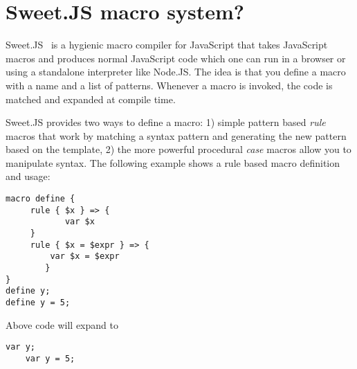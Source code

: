 \section{Sweet.JS macro system?}

Sweet.JS~\cite{bib6} is a hygienic macro compiler for JavaScript that takes JavaScript macros and produces normal JavaScript code which one can run in a browser or using a standalone interpreter like Node.JS. The idea is that you define a macro with a name and a list of patterns. Whenever a macro is invoked, the code is matched and expanded at  compile time.

Sweet.JS provides two ways to define a macro: 1) simple pattern based \textit{rule} macros that work by matching a syntax pattern and generating the new pattern based on the template, 2) the more powerful procedural \textit{case} macros allow you to manipulate syntax. The following example shows a rule based macro definition and usage:

\begin{lstlisting}[frame=single]
macro define {
   	 rule { $x } => {
   		    var $x
   	 }
   	 rule { $x = $expr } => {
   	     var $x = $expr
    	}
}
define y;
define y = 5;
\end{lstlisting}

Above code will expand to
\begin{lstlisting}[frame=single]
	var y;
	var y = 5;
\end{lstlisting}
